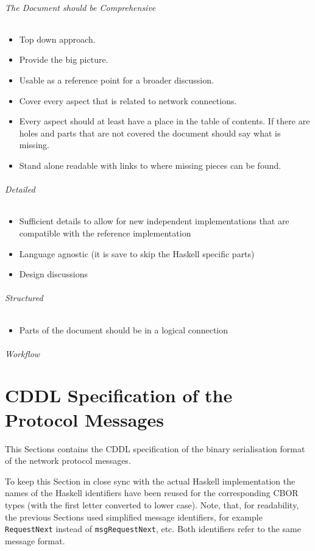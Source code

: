 \documentclass{report}
\newcommand{\hsref}[1]{}
\theoremstyle{definition}{
  \newtheorem{lemma}{Lemma}[section] %
  \newtheorem{definition}[lemma]{Definition}
}
\theoremstyle{theorem}{
  \newtheorem{invariant}[lemma]{Invariant}
  \newtheorem{proofobligation}[lemma]{Proof Obligation}
}
\numberwithin{equation}{lemma}
\begin{document}
{\subparagraph{The Document should be Comprehensive}
\begin{itemize}
\item Top down approach.
\item Provide the big picture.
\item Usable as a reference point for a broader discussion.
\item Cover every aspect that is related to network connections.
\item Every aspect should at least have a place in the table of contents.
  If there are holes and parts that are not covered the document should say what is missing.
\item Stand alone readable with links to where missing pieces can be found.
\end{itemize}

\subparagraph{Detailed}
\begin{itemize}
\item Sufficient details to allow for new independent implementations that are compatible with
the reference implementation
\item Language agnostic (it is save to skip the Haskell specific parts)
\item Design discussions
\end{itemize}
\subparagraph{Structured}
\begin{itemize}
\item Parts of the document should be in a logical connection
\end{itemize}
\subparagraph{Workflow}
}

\appendix
\chapter{CDDL Specification of the Protocol Messages}
\label{CBOR-section}
\hsref{ouroboros-network/src/Ouroboros/Network/Protocol/PingPong/Codec.hs}
\label{included-cddl}
This Sections contains the CDDL\cite{cddl} specification
of the binary serialisation format of the network protocol messages.

To keep this Section in close sync with the actual Haskell implementation
the names of the Haskell identifiers have been reused for the corresponding
CBOR types (with the first letter converted to lower case).
Note, that, for readability, the previous Sections used simplified message identifiers,
for example {\tt RequestNext} instead of {\tt msgRequestNext}, etc.
Both identifiers refer to the same message format.
\end{document}
